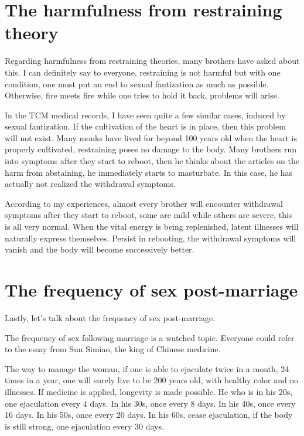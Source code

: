 \documentclass[
]{book}
\begin{document}
\hypertarget{the-harmfulness-from-restraining-theory}{%
\section{The harmfulness from restraining theory}\label{the-harmfulness-from-restraining-theory}}

Regarding harmfulness from restraining theories, many brothers have asked about this. I can definitely say to everyone, restraining is not harmful but with one condition, one must put an end to sexual fantization as much as possible. Otherwise, fire meets fire while one tries to hold it back, problems will arise.

In the TCM medical records, I have seen quite a few similar cases, induced by sexual fantization. If the cultivation of the heart is in place, then this problem will not exist. Many monks have lived for beyond 100 years old when the heart is properly cultivated, restraining poses no damage to the body. Many brothers run into symptoms after they start to reboot, then he thinks about the articles on the harm from abstaining, he immediately starts to masturbate. In this case, he has actually not realized the withdrawal symptoms.

According to my experiences, almost every brother will encounter withdrawal symptoms after they start to reboot, some are mild while others are severe, this is all very normal. When the vital energy is being replenished, latent illnesses will naturally express themselves. Persist in rebooting, the withdrawal symptoms will vanish and the body will become successively better.

\hypertarget{the-frequency-of-sex-post-marriage}{%
\section{The frequency of sex post-marriage}\label{the-frequency-of-sex-post-marriage}}

Lastly, let's talk about the frequency of sex post-marriage.

The frequency of sex following marriage is a watched topic. Everyone could refer to the essay from Sun Simiao, the king of Chinese medicine.

The way to manage the woman, if one is able to ejaculate twice in a month, 24 times in a year, one will surely live to be 200 years old, with healthy color and no illnesses. If medicine is applied, longevity is made possible. He who is in his 20s, one ejaculation every 4 days. In his 30s, once every 8 days. In his 40s, once every 16 days. In his 50s, once every 20 days. In his 60s, cease ejaculation, if the body is still strong, one ejaculation every 30 days.
\end{document}

